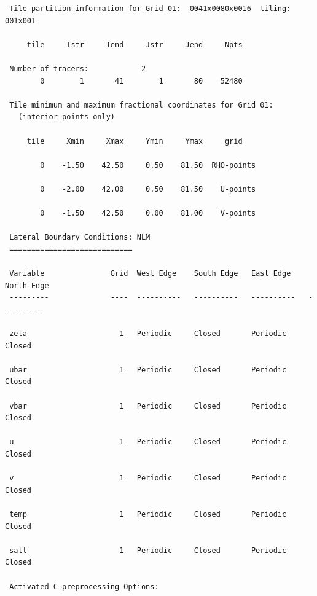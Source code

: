 \begin{verbatim}
 Tile partition information for Grid 01:  0041x0080x0016  tiling: 001x001

     tile     Istr     Iend     Jstr     Jend     Npts

 Number of tracers:            2
        0        1       41        1       80    52480

 Tile minimum and maximum fractional coordinates for Grid 01:
   (interior points only)

     tile     Xmin     Xmax     Ymin     Ymax     grid

        0    -1.50    42.50     0.50    81.50  RHO-points

        0    -2.00    42.00     0.50    81.50    U-points

        0    -1.50    42.50     0.00    81.00    V-points

 Lateral Boundary Conditions: NLM
 ============================

 Variable               Grid  West Edge    South Edge   East Edge    North Edge
 ---------              ----  ----------   ----------   ----------   ----------

 zeta                     1   Periodic     Closed       Periodic     Closed

 ubar                     1   Periodic     Closed       Periodic     Closed

 vbar                     1   Periodic     Closed       Periodic     Closed

 u                        1   Periodic     Closed       Periodic     Closed

 v                        1   Periodic     Closed       Periodic     Closed

 temp                     1   Periodic     Closed       Periodic     Closed

 salt                     1   Periodic     Closed       Periodic     Closed

 Activated C-preprocessing Options:


\end{verbatim}
